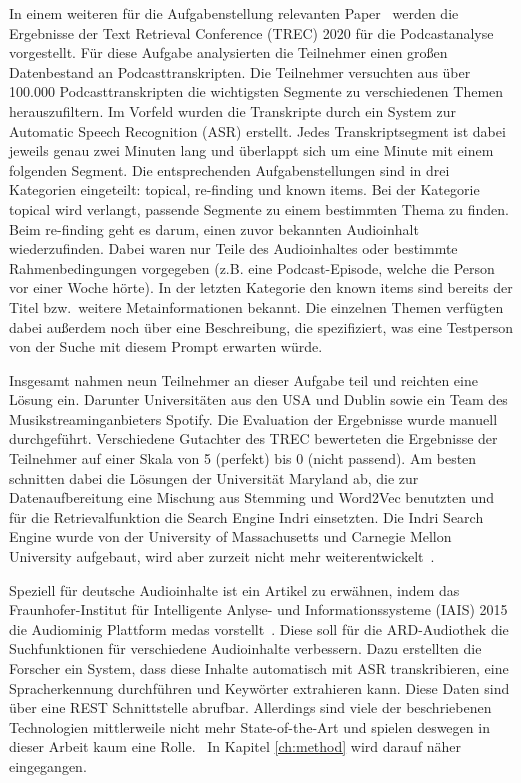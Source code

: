 In einem weiteren für die Aufgabenstellung relevanten Paper~\cite{jones2021} werden die Ergebnisse der Text Retrieval Conference (TREC) 2020 für die Podcastanalyse vorgestellt.
Für diese Aufgabe analysierten die Teilnehmer einen großen Datenbestand an Podcasttranskripten.
Die Teilnehmer versuchten aus über 100.000 Podcasttranskripten die wichtigsten Segmente zu verschiedenen Themen herauszufiltern.
Im Vorfeld wurden die Transkripte durch ein System zur Automatic Speech Recognition (ASR) erstellt.
Jedes Transkriptsegment ist dabei jeweils genau zwei Minuten lang und überlappt sich um eine Minute mit einem folgenden Segment.
Die entsprechenden Aufgabenstellungen sind in drei Kategorien eingeteilt: topical, re-finding und known items.
Bei der Kategorie topical wird verlangt, passende Segmente zu einem bestimmten Thema zu finden.
Beim re-finding geht es darum, einen zuvor bekannten Audioinhalt wiederzufinden.
Dabei waren nur Teile des Audioinhaltes oder bestimmte Rahmenbedingungen vorgegeben (z.B. eine Podcast-Episode, welche die Person vor einer Woche hörte).
In der letzten Kategorie den known items sind bereits der Titel bzw.\ weitere Metainformationen bekannt.
Die einzelnen Themen verfügten dabei außerdem noch über eine Beschreibung, die spezifiziert, was eine Testperson von der Suche mit diesem Prompt erwarten würde.


Insgesamt nahmen neun Teilnehmer an dieser Aufgabe teil und reichten eine Lösung ein.
Darunter Universitäten aus den USA und Dublin sowie ein Team des Musikstreaminganbieters Spotify.
Die Evaluation der Ergebnisse wurde manuell durchgeführt.
Verschiedene Gutachter des TREC bewerteten die Ergebnisse der Teilnehmer auf einer Skala von 5 (perfekt) bis 0 (nicht passend).
Am besten schnitten dabei die Lösungen der Universität Maryland ab, die zur Datenaufbereitung eine Mischung aus Stemming und Word2Vec benutzten und für die Retrievalfunktion die Search Engine Indri einsetzten.
Die Indri Search Engine wurde von der University of Massachusetts und Carnegie Mellon University aufgebaut, wird aber zurzeit nicht mehr weiterentwickelt~\cite{lemur}.


Speziell für deutsche Audioinhalte ist ein Artikel zu erwähnen, indem das Fraunhofer-Institut für Intelligente Anlyse- und Informationssysteme (IAIS) 2015 die Audiominig Plattform medas vorstellt~\cite{maroni2020}.
Diese soll für die ARD-Audiothek die Suchfunktionen für verschiedene Audioinhalte verbessern.
Dazu erstellten die Forscher ein System, dass diese Inhalte automatisch mit ASR transkribieren, eine Spracherkennung durchführen und Keywörter extrahieren kann.
Diese Daten sind über eine REST Schnittstelle abrufbar.
Allerdings sind viele der beschriebenen Technologien mittlerweile nicht mehr State-of-the-Art und spielen deswegen in dieser Arbeit kaum eine Rolle.~\cite{maroni2020}
In Kapitel \autoref{ch:method} wird darauf näher eingegangen.
